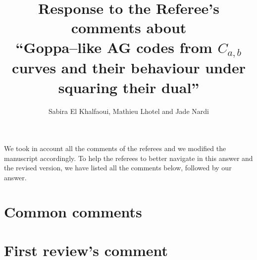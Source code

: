 \documentclass[12pt,a4paper]{amsart}
\title[Goppa--like AG codes from $C_{a,b}$ curves and their behaviour under squaring their dual]{Response to the Referee's comments about  \\ ``Goppa--like AG codes from $C_{a,b}$ curves and their behaviour under squaring their dual''}
\author{Sabira El Khalfaoui, Mathieu Lhotel and Jade Nardi}
\begin{document}
\maketitle
We took in account all the comments of the referees and we modified the manuscript accordingly. To help the referees to better navigate in this answer and the revised version, we have listed all the comments below, followed by our answer. 
\section*{Common comments}
 
\section*{First review's comment}
\end{document}
